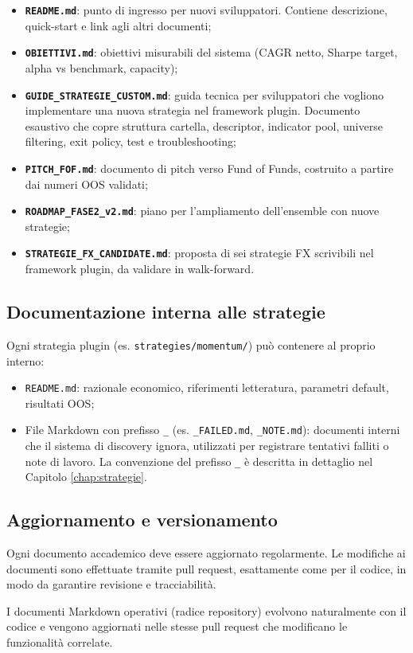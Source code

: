 \begin{itemize}
  \item \textbf{\texttt{README.md}}: punto di ingresso per nuovi sviluppatori. Contiene descrizione, quick-start e link agli altri documenti;
  \item \textbf{\texttt{OBIETTIVI.md}}: obiettivi misurabili del sistema (CAGR netto, Sharpe target, alpha vs benchmark, capacity);
  \item \textbf{\texttt{GUIDE\_STRATEGIE\_CUSTOM.md}}: guida tecnica per sviluppatori che vogliono implementare una nuova strategia nel framework plugin. Documento esaustivo che copre struttura cartella, descriptor, indicator pool, universe filtering, exit policy, test e troubleshooting;
  \item \textbf{\texttt{PITCH\_FOF.md}}: documento di pitch verso Fund of Funds, costruito a partire dai numeri OOS validati;
  \item \textbf{\texttt{ROADMAP\_FASE2\_v2.md}}: piano per l'ampliamento dell'ensemble con nuove strategie;
  \item \textbf{\texttt{STRATEGIE\_FX\_CANDIDATE.md}}: proposta di sei strategie FX scrivibili nel framework plugin, da validare in walk-forward.
\end{itemize}

\subsection{Documentazione interna alle strategie}

Ogni strategia plugin (es. \texttt{strategies/momentum/}) può contenere al proprio interno:

\begin{itemize}
  \item \texttt{README.md}: razionale economico, riferimenti letteratura, parametri default, risultati OOS;
  \item File Markdown con prefisso \texttt{\_} (es. \texttt{\_FAILED.md}, \texttt{\_NOTE.md}): documenti interni che il sistema di discovery ignora, utilizzati per registrare tentativi falliti o note di lavoro. La convenzione del prefisso \texttt{\_} è descritta in dettaglio nel Capitolo \ref{chap:strategie}.
\end{itemize}

\subsection{Aggiornamento e versionamento}

Ogni documento accademico deve essere aggiornato regolarmente. Le modifiche ai documenti sono effettuate tramite pull request, esattamente come per il codice, in modo da garantire revisione e tracciabilità.

I documenti Markdown operativi (radice repository) evolvono naturalmente con il codice e vengono aggiornati nelle stesse pull request che modificano le funzionalità correlate.
